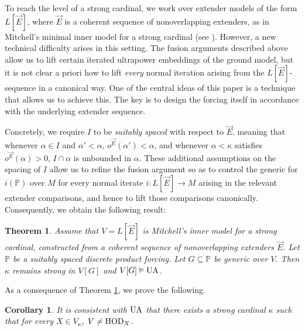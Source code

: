 \documentclass{article}
\theoremstyle{definition}
\theoremstyle{plain}
\newtheorem{theorem}[definition]{Theorem}
\newtheorem{corollary}[definition]{Corollary}
\newcommand{\po}{\mathbb{P}}
\begin{document}
To reach the level of a strong cardinal, we work over extender models of the form $L[\vec E]$, where $\vec E$ is a coherent sequence of nonoverlapping extenders, as in Mitchell's minimal inner model for a strong cardinal (see \cite{MitchellInnerModel}). However, a new technical difficulty arises in this setting. The fusion arguments described above allow us to lift certain iterated ultrapower embeddings of the ground model, but it is not clear a priori how to lift \emph{every} normal iteration arising from the $L[\vec E]$-sequence in a canonical way. One of the central ideas of this paper is a technique that allows us to achieve this. The key is to design the forcing itself in accordance with the underlying extender sequence.

Concretely, we require $I$ to be \emph{suitably spaced} with respect to $\vec E$, meaning that whenever $\alpha\in I$ and $\alpha'<\alpha$, $o^{\vec E}(\alpha')<\alpha$, and whenever $\alpha<\kappa$ satisfies $o^{\vec E}(\alpha)>0$, $I\cap\alpha$ is unbounded in $\alpha$. These additional assumptions on the spacing of $I$ allow us to refine the fusion argument so as to control the generic for $i(\po)$ over $M$ for every normal iterate $i\colon L[\vec E]\to M$ arising in the relevant extender comparisons, and hence to lift those comparisons canonically. Consequently, we obtain the following result:


\begin{theorem}\label{Thm:MainThmForStrong}
    Assume that $V = L[\vec{E}]$ is Mitchell's inner model for a strong cardinal, constructed from a coherent sequence of nonoverlapping extenders  $\vec{E}$. Let $\po$ be a suitably spaced discrete product forcing. Let $G\subseteq \po$ be generic over $V$. Then $\kappa$ remains strong in $V[G]$ and $V[G]\vDash{\rm UA}$.
\end{theorem}

As a consequence of Theorem \ref{Thm:MainThmForStrong}, we prove the following.

\begin{corollary}\label{Cor:UA+Strong+FarFromHOD}
    It is consistent with ${\rm UA}$ that there exists a strong cardinal $\kappa$ such that for every $X\in V_{\kappa}$, $V\neq {\rm HOD}_X$.
\end{corollary}
\end{document}
